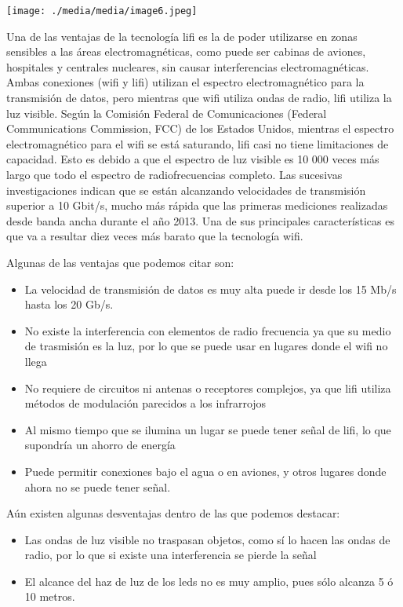 \texttt{[image: ./media/media/image6.jpeg]}

Una de las ventajas de la tecnología lifi es la de poder utilizarse en
zonas sensibles a las áreas electromagnéticas, como puede ser cabinas de
aviones, hospitales y centrales nucleares, sin causar interferencias
electromagnéticas. Ambas conexiones (wifi y lifi) utilizan el espectro
electromagnético para la transmisión de datos, pero mientras que wifi
utiliza ondas de radio, lifi utiliza la luz visible. Según la Comisión
Federal de Comunicaciones (Federal Communications Commission, FCC) de
los Estados Unidos, mientras el espectro electromagnético para el wifi
se está saturando, lifi casi no tiene limitaciones de capacidad. Esto es
debido a que el espectro de luz visible es 10 000 veces más largo que
todo el espectro de radiofrecuencias completo. Las sucesivas
investigaciones indican que se están alcanzando velocidades de
transmisión superior a 10 Gbit/s, mucho más rápida que las primeras
mediciones realizadas desde banda ancha durante el año 2013. Una de sus
principales características es que va a resultar diez veces más barato
que la tecnología wifi.

Algunas de las ventajas que podemos citar son:

\begin{itemize}
\item
  La velocidad de transmisión de datos es muy alta puede ir desde los 15
  Mb/s hasta los 20 Gb/s.
\item
  No existe la interferencia con elementos de radio frecuencia ya que su
  medio de trasmisión es la luz, por lo que se puede usar en lugares
  donde el wifi no llega
\item
  No requiere de circuitos ni antenas o receptores complejos, ya que
  lifi utiliza métodos de modulación parecidos a los infrarrojos
\item
  Al mismo tiempo que se ilumina un lugar se puede tener señal de lifi,
  lo que supondría un ahorro de energía
\item
  Puede permitir conexiones bajo el agua o en aviones, y otros lugares
  donde ahora no se puede tener señal.
\end{itemize}

Aún existen algunas desventajas dentro de las que podemos destacar:

\begin{itemize}
\item
  Las ondas de luz visible no traspasan objetos, como sí lo hacen las
  ondas de radio, por lo que si existe una interferencia se pierde la
  señal
\item
  El alcance del haz de luz de los leds no es muy amplio, pues sólo
  alcanza 5 ó 10 metros.
\end{itemize}

